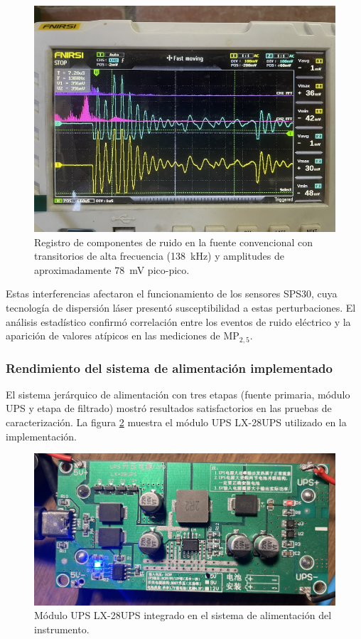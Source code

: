 \begin{figure}[h]
	\centering
	\includegraphics[width=0.8\linewidth]{Figures/test_fuente_condiciones_iniciales.JPEG}
	\caption{Registro de componentes de ruido en la fuente convencional con transitorios de alta frecuencia (\SI{138}{\kilo\hertz}) y amplitudes de aproximadamente \SI{78}{\milli\volt} pico-pico.}
	\label{fig:fuente_sin_filtro}
\end{figure}

Estas interferencias afectaron el funcionamiento de los sensores SPS30, cuya tecnología de dispersión láser presentó susceptibilidad a estas perturbaciones. El análisis estadístico confirmó correlación entre los eventos de ruido eléctrico y la aparición de valores atípicos en las mediciones de MP$_{2,5}$.

\subsubsection{Rendimiento del sistema de alimentación implementado}

El sistema jerárquico de alimentación con tres etapas (fuente primaria, módulo UPS y etapa de filtrado) mostró resultados satisfactorios en las pruebas de caracterización. La figura \ref{fig:modulo_ups} muestra el módulo UPS LX-28UPS utilizado en la implementación.

\begin{figure}[h]
	\centering
	\includegraphics[width=0.7\linewidth]{Figures/IMG_9397 (1)}
	\caption{Módulo UPS LX-28UPS integrado en el sistema de alimentación del instrumento.}
	\label{fig:modulo_ups}
\end{figure}

